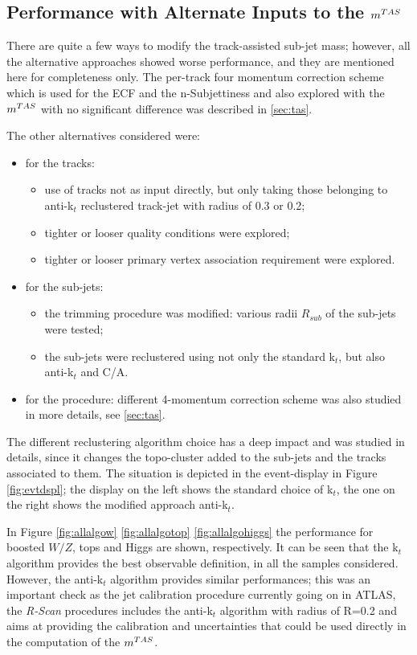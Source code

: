 \subsection{Performance with Alternate Inputs to the $m^{TAS}$}
\label{sec:alternate}

There are quite a few ways to modify the track-assisted sub-jet mass; however, all the alternative approaches showed worse performance, and they are mentioned here for completeness only.
The per-track four momentum correction scheme which is used for the ECF and the n-Subjettiness and also explored with the $m^{TAS}$ with no significant difference was described in \ref{sec:tas}.

The other alternatives considered were: 
\begin{itemize}
 \item for the tracks:
 \begin{itemize}
   \item use of tracks not as input directly, but only taking those belonging to anti-k$_t$ reclustered track-jet with radius of 0.3 or 0.2;
   \item tighter or looser quality conditions were explored;
   \item tighter or looser primary vertex association requirement were explored.
 \end{itemize}
 \item for the sub-jets:
  \begin{itemize}
   \item the trimming procedure was modified: various radii $R_{sub}$ of the sub-jets were tested;
   \item the sub-jets were reclustered using not only the standard k$_t$, but also anti-k$_t$ and C/A.
  \end{itemize}
  \item for the procedure: different 4-momentum correction scheme was also studied in more details, see \ref{sec:tas}.
\end{itemize}

The different reclustering algorithm choice has a deep impact and was studied in details, since it changes the topo-cluster added to the sub-jets and the tracks associated to them. The situation is depicted in the event-display in Figure \ref{fig:evtdspl}; the display on the left shows the standard choice of k$_t$, the one on the right shows the modified approach anti-k$_t$. 

In Figure \ref{fig:allalgow} \ref{fig:allalgotop} \ref{fig:allalgohiggs} the performance for boosted $W/Z$, tops and Higgs are shown, respectively. It can be seen that the k$_t$ algorithm provides the best observable definition, in all the samples considered. However, the anti-k$_t$ algorithm provides similar performances; this was an important check as the jet calibration procedure currently going on in ATLAS, the \textit{R-Scan} procedures includes the anti-k$_t$ algorithm with radius of R=0.2 and aims at providing the calibration and uncertainties that could be used directly in the computation of the $m^{TAS}$.

